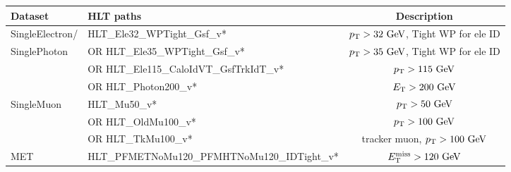 \footnotesize
\begin{tabular}{l|l|c}
  \hline
  Dataset        & HLT paths                                    & Description\\
  \hline \hline
  \ttfamily SingleElectron/& \ttfamily HLT\_Ele32\_WPTight\_Gsf\_v*                 & $\pt>32\unit{GeV}$, Tight WP for ele ID  \\
  \ttfamily SinglePhoton   & \ttfamily OR HLT\_Ele35\_WPTight\_Gsf\_v*              & $\pt>35\unit{GeV}$, Tight WP for ele ID  \\
                 & \ttfamily OR HLT\_Ele115\_CaloIdVT\_GsfTrkIdT\_v*      & $\pt>115\unit{GeV}$  \\
                 & \ttfamily OR HLT\_Photon200\_v*                        & $\Et>200\unit{GeV}$  \\
  \hline
  \ttfamily SingleMuon     & \ttfamily HLT\_Mu50\_v*                                & $\pt>50\unit{GeV}$ \\
                 & \ttfamily OR HLT\_OldMu100\_v*                         & $\pt>100\unit{GeV}$ \\
                 & \ttfamily OR HLT\_TkMu100\_v*                          & tracker muon, $\pt>100\unit{GeV}$ \\
  \hline
  \ttfamily MET            & \ttfamily HLT\_PFMETNoMu120\_PFMHTNoMu120\_IDTight\_v* & $\Etmiss>120\unit{GeV}$ \\
  \hline
\end{tabular}
